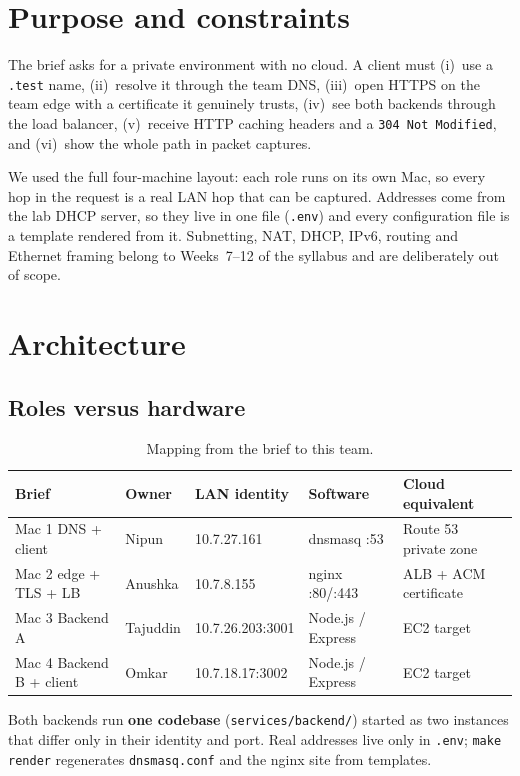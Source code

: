 \documentclass[11pt,a4paper]{article}
\begin{document}
\section{Purpose and constraints}
The brief asks for a private environment with no cloud. A client must (i)~use a
\texttt{.test} name, (ii)~resolve it through the team DNS, (iii)~open HTTPS on the team edge
with a certificate it genuinely trusts, (iv)~see both backends through the load balancer,
(v)~receive HTTP caching headers and a \texttt{304 Not Modified}, and (vi)~show the whole path
in packet captures.

We used the full four-machine layout: each role runs on its own Mac, so every hop in the
request is a real LAN hop that can be captured. Addresses come from the lab DHCP server,
so they live in one file (\texttt{.env}) and every configuration file is a template rendered
from it. Subnetting, NAT, DHCP, IPv6, routing and Ethernet framing belong to Weeks~7--12
of the syllabus and are deliberately out of scope.

\section{Architecture}

\subsection{Roles versus hardware}
\begin{table}[H]
\centering
\caption{Mapping from the brief to this team.}
{\small
\begin{tabular}{@{}lllll@{}}
\toprule
\textbf{Brief} & \textbf{Owner} & \textbf{LAN identity} & \textbf{Software} & \textbf{Cloud equivalent} \\
\midrule
Mac 1 DNS + client & Nipun & 10.7.27.161 & dnsmasq :53 & Route 53 private zone \\
Mac 2 edge + TLS + LB & Anushka & 10.7.8.155 & nginx :80/:443 & ALB + ACM certificate \\
Mac 3 Backend A & Tajuddin & 10.7.26.203:3001 & Node.js / Express & EC2 target \\
Mac 4 Backend B + client & Omkar & 10.7.18.17:3002 & Node.js / Express & EC2 target \\
\bottomrule
\end{tabular}}
\end{table}

Both backends run \textbf{one codebase} (\texttt{services/backend/}) started as two instances
that differ only in their identity and port. Real addresses live only in \texttt{.env};
\texttt{make render} regenerates \texttt{dnsmasq.conf} and the nginx site from templates.
\end{document}
